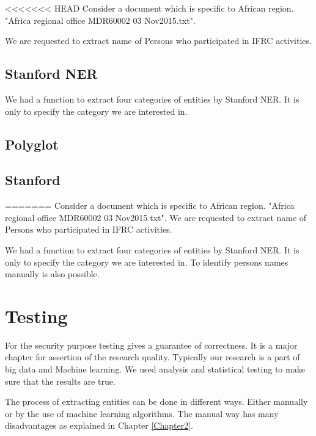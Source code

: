 <<<<<<< HEAD
Consider a document which is specific to African region. "Africa regional office MDR60002 03 Nov2015.txt".

We are requested to extract name of Persons who participated in IFRC activities.

\subsection{Stanford NER}

We had a function to extract four categories of entities by Stanford NER. It is only to specify the category we are interested in.
\subsection{Polyglot}
\subsection{Stanford}
=======
Consider a document which is specific to African region. "Africa regional office MDR60002 03 Nov2015.txt". We are requested to extract name of Persons who participated in IFRC activities.

We had a function to extract four categories of entities by Stanford NER. It is only to specify the category we are interested in. To identify persons names manually is also possible.

\newpage
\section{Testing}\label{chp4}
For the security purpose testing gives a guarantee of correctness.  It is a major chapter for assertion of the research quality. Typically our research is a part of big data and Machine learning. We used analysis and statistical testing to make sure that the results are true.

The process of extracting entities can be done in different ways. Either manually or by the use of machine learning algorithms. The manual way has many disadvantages as explained in Chapter \ref{Chapter2}.

